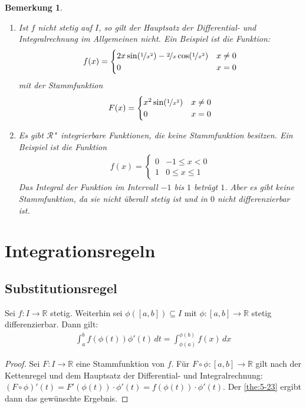 \documentclass[ngerman,titlepage,twoside, parskip=half*]{scrreprt}
\newcommand*{\R}{\mathbb{R}}
\newcommand*{\RR}{\mathcal{R}}
\theoremstyle{break}
\theoremstyle{nonumberbreak}
\newtheorem{remark}{Bemerkung}
\newtheorem{proof}{Beweis:}
\begin{document}
\begin{remark}
  \begin{enumerate}
   \item Ist $f$ nicht stetig auf $I$, so gilt der Hauptsatz der Differential-
    und Integralrechnung im Allgemeinen nicht. Ein Beispiel ist die Funktion:
    \begin{gather*}
      f(x)=
	 \begin{cases}
	   2x\sin(\nicefrac{1}{x^{2}})-\nicefrac{2}{x}\cos(\nicefrac{1}{x^{2}})
	   & x\neq0\\
	   0 & x=0
	 \end{cases}
    \end{gather*}
    mit der Stammfunktion
    \begin{gather*}
      F(x)=
	 \begin{cases}
	   x^{2}\sin(\nicefrac{1}{x^{2}}) & x\neq0\\
	   0 & x=0
	 \end{cases}
    \end{gather*}
   \item Es gibt $\RR$"~integrierbare Funktionen, die keine Stammfunktion
    besitzen. Ein Beispiel ist die Funktion
    \begin{gather*}
      f(x)=
	 \begin{cases}
	   0 & -1\leq x<0\\
	   1 & 0\leq x\leq1
	 \end{cases}
    \end{gather*}
    Das Integral der Funktion im Intervall $-1$ bis $1$ beträgt $1$. Aber es
    gibt keine Stammfunktion, da sie nicht überall stetig ist und in $0$ nicht
    differenzierbar ist.
  \end{enumerate}
\end{remark}

\section{Integrationsregeln}

\subsection{Substitutionsregel}

Sei $f\colon I\rightarrow\R$ stetig. Weiterhin sei $\phi([a,b])\subseteq I$
mit $\phi\colon[a,b]\rightarrow\R$ stetig differenzierbar. Dann gilt:
\begin{gather*}
  \int_{a}^{b} f(\phi(t))\phi'(t)\,dt= \int_{\phi(a)}^{\phi(b)} f(x)\,dx
\end{gather*}
\begin{proof}
  Sei $F\colon I\rightarrow\R$ eine Stammfunktion von $f$. Für
  $F\circ\phi\colon[a,b]\rightarrow\R$ gilt nach der Kettenregel und dem
  Hauptsatz der Differential- und Integralrechnung: $(F\circ\phi)'(t)=
  F'(\phi(t))\cdot\phi'(t)= f(\phi(t))\cdot\phi'(t)$. Der \autoref{the:5-23}
  ergibt dann das gewünschte Ergebnis.
\end{proof}
\end{document}
